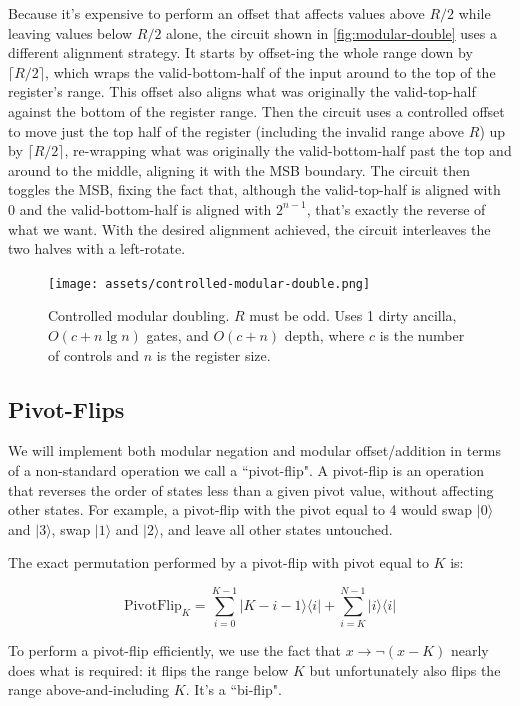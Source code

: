 \documentclass[twocolumn,longbibliography]{quantumarticle-customized}
\begin{document}
Because it's expensive to perform an offset that affects values above $R/2$ while leaving values below $R/2$ alone, the circuit shown in \autoref{fig:modular-double} uses a different alignment strategy.
It starts by offset-ing the whole range down by $\lceil R/2 \rceil$, which wraps the valid-bottom-half of the input around to the top of the register's range.
This offset also aligns what was originally the valid-top-half against the bottom of the register range.
Then the circuit uses a controlled offset to move just the top half of the register (including the invalid range above $R$) up by $\lceil R/2 \rceil$, re-wrapping what was originally the valid-bottom-half past the top and around to the middle, aligning it with the MSB boundary.
The circuit then toggles the MSB, fixing the fact that, although the valid-top-half is aligned with 0 and the valid-bottom-half is aligned with $2^{n-1}$, that's exactly the reverse of what we want.
With the desired alignment achieved, the circuit interleaves the two halves with a left-rotate.


\begin{figure}
  \centering
  \texttt{[image: assets/controlled-modular-double.png]}
  \caption{
    Controlled modular doubling.
    $R$ must be odd.
    Uses 1 dirty ancilla, $O(c + n \lg n)$ gates, and $O(c + n)$ depth, where $c$ is the number of controls and $n$ is the register size.
  }
  \label{fig:modular-double}
\end{figure}


\subsection{Pivot-Flips} \label{sec:pivot-flips}

We will implement both modular negation and modular offset/addition in terms of a non-standard operation we call a ``pivot-flip".
A pivot-flip is an operation that reverses the order of states less than a given pivot value, without affecting other states.
For example, a pivot-flip with the pivot equal to 4 would swap $|0\rangle$ and $|3\rangle$, swap $|1\rangle$ and $|2\rangle$, and leave all other states untouched.

The exact permutation performed by a pivot-flip with pivot equal to $K$ is:

$$\text{PivotFlip}_K = \sum_{i=0}^{K-1} |K-i-1\rangle \langle i| + \sum_{i=K}^{N-1} |i\rangle \langle i|$$

To perform a pivot-flip efficiently, we use the fact that $x \rightarrow \lnot(x - K)$ nearly does what is required: it flips the range below $K$ but unfortunately also flips the range above-and-including $K$.
It's a ``bi-flip".
\end{document}
